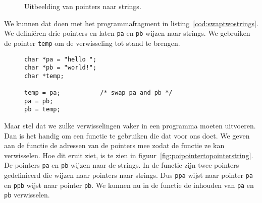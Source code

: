 \begin{figure}[!ht]
\centering
{}
\caption{Uitbeelding van pointers naar strings.}
\label{fig:poipointertostring}
\end{figure}

We kunnen dat doen met het programmafragment in listing~\ref{cod:swaptwostrings}. We definiëren drie pointers en laten \texttt{pa} en \texttt{pb} wijzen naar strings. We gebruiken de pointer \texttt{temp} om de verwisseling tot stand te brengen.

\begin{figure}[!ht]
\begin{lstlisting}[caption=Verwisselen van twee pointers.,label=cod:swaptwostrings]
char *pa = "hello ";
char *pb = "world!";
char *temp;

temp = pa;           /* swap pa and pb */
pa = pb;
pb = temp;
\end{lstlisting}
\end{figure}

Maar stel dat we zulke verwisselingen vaker in een programma moeten uitvoeren. Dan is het handig om een functie te gebruiken die dat voor ons doet. We geven aan de functie de adressen van de pointers mee zodat de functie ze kan verwisselen. Hoe dit eruit ziet, is te zien in figuur~\ref{fig:poipointertopointerstring}. De pointers \texttt{pa} en \texttt{pb} wijzen naar de strings. In de functie zijn twee pointers gedefinieerd die wijzen naar pointers naar strings. Dus \texttt{ppa} wijst naar pointer \texttt{pa} en \texttt{ppb} wijst naar pointer \texttt{pb}. We kunnen nu in de functie de inhouden van \texttt{pa} en \texttt{pb} verwisselen.


